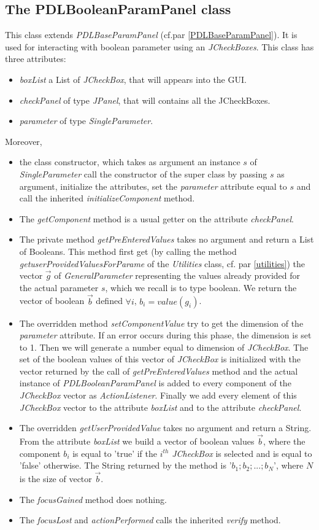 \documentclass[a4paper,11pt] {ivoa}
\begin{document}
\subsection{The PDLBooleanParamPanel class}\label{PDLBooleanParamPanel}
This class extends {\it PDLBaseParamPanel} (cf.par \ref{PDLBaseParamPanel}). It is used for interacting with boolean parameter using an  {\it JCheckBoxes}. This class has three attributes:
\begin{itemize}
\item {\it boxList} a List of {\it JCheckBox}, that will appears into the GUI.
\item {\it checkPanel} of type  {\it JPanel}, that will contains all the JCheckBoxes.
\item {\it parameter} of type {\it SingleParameter}.
\end{itemize}
Moreover, 
\begin{itemize}
\item the class constructor, which takes as argument an instance $s$ of {\it SingleParameter} call the constructor of the super class by passing $s$ as argument, initialize the attributes, set the {\it parameter} attribute equal to $s$ and call the inherited  {\it initializeComponent} method.
\item The {\it getComponent} method is a usual getter on the attribute {\it checkPanel}.
\item The private method {\it getPreEnteredValues} takes no argument and return a List of Booleans. This method first get (by calling the method {\it getuserProvidedValuesForParame} of the {\it Utilities} class, cf. par \ref{utilities}) the vector $\vec g$ of {\it GeneralParameter} representing the values already provided for the actual parameter $s$, which we recall is to type boolean. We return the vector of boolean $\vec b$ defined $\forall i$, $b_i = value(g_i)$. 
\item The overridden method {\it setComponentValue} try to get the dimension of the {\it parameter} attribute. If an error occurs during this phase, the dimension is set to 1. Then we will generate a number equal to dimension of {\it JCheckBox}. The set of the boolean values of this vector of {\it JCheckBox} is initialized with the vector returned by the call of {\it getPreEnteredValues} method and the actual instance of {\it PDLBooleanParamPanel} is added to every component of the {\it JCheckBox} vector  as {\it ActionListener}. Finally we add every element of this {\it JCheckBox} vector to the attribute {\it boxList} and to the attribute {\it checkPanel}.
\item The overridden {\it getUserProvidedValue} takes no argument and return a String. From the attribute {\it boxList} we build a vector of boolean values $\vec b$, where the component $b_i$ is equal to 'true' if the $i^{th} $ {\it JCheckBox} is selected and is equal to 'false' otherwise. The String returned by the method is '$b_1;b_2;...;b_N$', where $N$ is the size of vector $\vec b$.
\item The {\it focusGained} method does nothing.
\item The {\it focusLost} and {\it actionPerformed} calls the inherited {\it verify} method.
\end{itemize}
\end{document}
